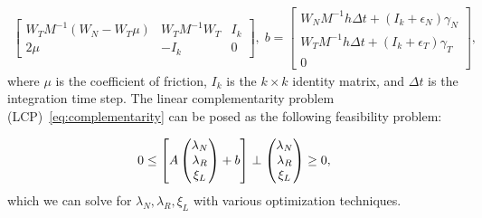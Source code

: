 {\begin{gather*}
\begin{bmatrix}
      W_T M^{-1} (W_N - W_T \mu) & W_T M^{-1} W_T & I_k  \\
      2\mu & -I_k & 0
    \end{bmatrix}, \;  b = \begin{bmatrix}
      W_N M^{-1} h \Delta t + (I_k+\epsilon_N) \gamma_N\\
      W_T M^{-1} h \Delta t + (I_k+\epsilon_T) \gamma_T\\
      0
    \end{bmatrix}, 
\end{gather*}
\noindent where $\mu$ is the coefficient of friction, $I_k$ is the $k \times k$
identity matrix, and $\Delta t$ is the integration time step.
%
The linear complementarity problem (LCP)~\eqref{eq:complementarity} can be posed as
the following feasibility problem:

\begin{equation}
    0 \leq 
    \left[ A \begin{pmatrix}
      \lambda_N \\
      \lambda_R \\
      \xi_L
    \end{pmatrix} + b \right]
    \perp
    \begin{pmatrix}
      \lambda_N \\
      \lambda_R \\
      \xi_L
    \end{pmatrix} \geq 0, \\
  \label{eq:feasibility} 
\end{equation}
\noindent which we can solve for $\lambda_N, \lambda_R, \xi_L$ with various
optimization techniques. }

